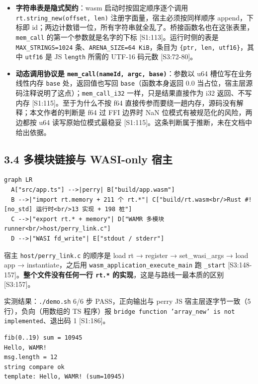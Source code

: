 \documentclass[11pt, a4paper]{article}
\begin{document}
\begin{itemize}
\item \textbf{字符串表是隐式契约}：wasm 启动时按固定顺序逐个调用 \texttt{rt.string\_new(offset, len)} 注册字面量，宿主必须按同样顺序 append，下标即 id；两边计数错一位，所有字符串就全乱了。桥接函数名也在这张表里，\texttt{mem\_call} 的第一个参数就是名字的下标 [S1:113]。运行时侧的表是 \texttt{MAX\_STRINGS=1024} 条、\texttt{ARENA\_SIZE=64 KiB}，条目为 \texttt{\{ptr, len, utf16\}}，其中 \texttt{utf16} 是 JS \texttt{length} 所需的 UTF-16 码元数 [S3:72-80]。
\item \textbf{动态调用协议是 \texttt{mem\_call(nameId, argc, base)}}：参数以 u64 槽位写在业务线性内存 \texttt{base} 处，返回值也写回 \texttt{base}（函数本身返回 0.0 当占位，宿主层源码注释说明了这点）；\texttt{mem\_call\_i32} 一样，只是结果直接作为 i32 返回、不写内存 [S1:115]。至于为什么不按 f64 直接传参而要绕一趟内存，源码没有解释；本文作者的判断是 f64 过 FFI 边界时 NaN 位模式有被规范化的风险，两边都按 u64 读写原始位模式最稳妥 [S1:115]。这条判断属于推断，未在文档中给出依据。
\end{itemize}

\subsection{3.4 多模块链接与 WASI-only 宿主}

\begin{verbatim}
graph LR
  A["src/app.ts"] -->|perry| B["build/app.wasm"]
  B -->|"import rt.memory + 211 个 rt.*"| C["build/rt.wasm<br/>Rust #![no_std] 运行时<br/>13 实现 + 198 桩"]
  C -->|"export rt.* + memory"| D["WAMR 多模块 runner<br/>host/perry_link.c"]
  D -->|"WASI fd_write"| E["stdout / stderr"]
\end{verbatim}

宿主 \texttt{host/perry\_link.c} 的顺序是 load rt → register → set\_wasi\_args → load app → instantiate，之后用 \texttt{wasm\_application\_execute\_main} 跑 \texttt{\_start} [S3:148-157]。\textbf{整个文件没有任何一行 \texttt{rt.*} 的实现}，这是与路线一最本质的区别 [S3:157]。


实测结果：\texttt{./demo.sh} 6/6 步 PASS，正向输出与 perry JS 宿主层逐字节一致（5 行），负向（用数组的 TS 程序）报 \texttt{bridge function 'array\_new' is not implemented}、退出码 1 [S1:186]。


\begin{verbatim}
fib(0..19) sum = 10945
Hello, WAMR!
msg.length = 12
string compare ok
template: Hello, WAMR! (sum=10945)
\end{verbatim}
\end{document}
